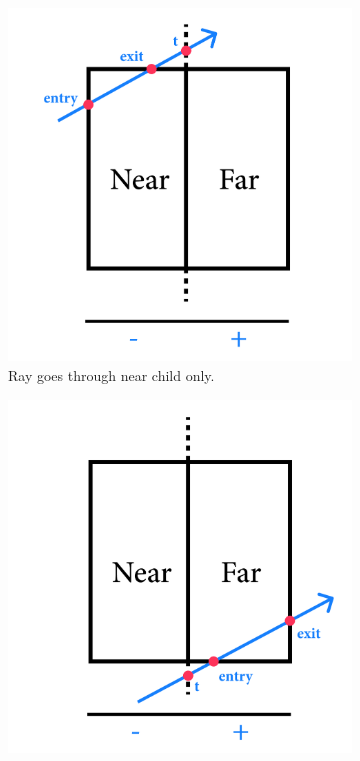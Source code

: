 \documentclass[a4paper,11pt,oneside]{article}
\begin{document}
\begin{figure}[ht]
	\centering
	\begin{subfigure}[b]{0.3\textwidth}
		\centering
		\includegraphics[width=\textwidth]{section4/4.3/near-intersection.png}
		\caption{Ray goes through near child only.}
		\label{sec4.3:near-child}
	\end{subfigure}
	\hfill
	\begin{subfigure}[b]{0.3\textwidth}
		\centering
		\includegraphics[width=\textwidth]{section4/4.3/far-intersection.png}

\end{subfigure}
\end{figure}
\end{document}
